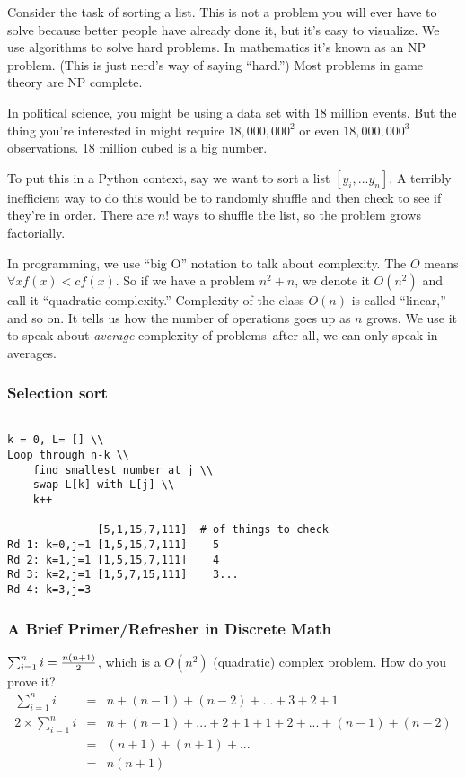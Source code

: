 \documentclass[12pt,letter]{article}
\begin{document}
Consider the task of sorting a list. This is not a problem you will
ever have to solve because better people have already done it, but
it's easy to visualize. We use algorithms to solve hard problems. In
mathematics it's known as an NP problem. (This is just nerd's way of
saying ``hard.'') Most problems in game theory are NP complete. 

In political science, you might be using a data set with 18 million
events. But the thing you're interested in might require
$18,000,000^2$ or even $18,000,000^3$ observations. 18 million cubed
is a big number.

To put this in a Python context, say we want to sort a list $[y_i,
... y_n]$. A terribly inefficient way to do this would be to randomly
shuffle and then check to see if they're in order. There are $n!$ ways
to shuffle the list, so the problem grows factorially. 

In programming, we use ``big O'' notation to talk about
complexity. The $O$ means $\forall x f(x) < cf(x)$. So if we have a
problem $n^2 + n$, we denote it $O(n^2)$ and call it ``quadratic
complexity.'' Complexity of the class $O(n)$ is called ``linear,'' and
so on. It tells us how the number of operations goes up as $n$
grows. We use it to speak about \emph{average} complexity of
problems--after all, we can only speak in averages. 



\subsubsection{Selection sort}
\begin{verbatim}

k = 0, L= [] \\
Loop through n-k \\
    find smallest number at j \\
    swap L[k] with L[j] \\
    k++

              [5,1,15,7,111]  # of things to check
Rd 1: k=0,j=1 [1,5,15,7,111]    5
Rd 2: k=1,j=1 [1,5,15,7,111]    4
Rd 3: k=2,j=1 [1,5,7,15,111]    3...
Rd 4: k=3,j=3
\end{verbatim}

\subsubsection{A Brief Primer/Refresher in Discrete Math}
$\sum_{i=1}^{n} i = {n(n+1) \over 2}$, which is a $O(n^2)$ (quadratic)
complex problem. How do you prove it? 
\begin{eqnarray*}
\sum_{i=1}^{n} i &=& n + (n-1) + (n-2) + ... + 3 + 2 + 1 \\
2 \times \sum_{i=1}^{n} i&=& n+ (n-1) + ... + 2 + 1 + 1 + 2 + ... + (n-1) + (n - 2) \\
&=& (n+1) + (n+1) + ... \\
&=& n(n+1) \\
\end{eqnarray*}
\end{document}
